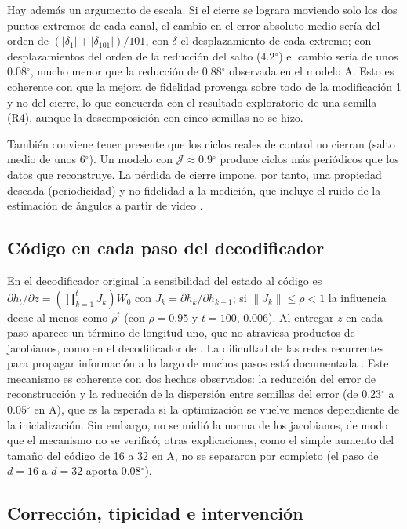 \documentclass[11pt,a4paper]{article}
\newcommand{\gr}{$^{\circ}$}
\begin{document}
Hay además un argumento de escala. Si el cierre se lograra moviendo solo los dos puntos extremos de cada canal, el cambio en el error absoluto medio sería del orden de $(|\delta_1|+|\delta_{101}|)/101$, con $\delta$ el desplazamiento de cada extremo; con desplazamientos del orden de la reducción del salto ($4.2$\gr) el cambio sería de unos $0.08$\gr{}, mucho menor que la reducción de $0.88$\gr{} observada en el modelo A. Esto es coherente con que la mejora de fidelidad provenga sobre todo de la modificación 1 y no del cierre, lo que concuerda con el resultado exploratorio de una semilla (R4), aunque la descomposición con cinco semillas no se hizo.

También conviene tener presente que los ciclos reales de control no cierran (salto medio de unos $6$\gr). Un modelo con $\mathcal J\approx0.9$\gr{} produce ciclos más periódicos que los datos que reconstruye. La pérdida de cierre impone, por tanto, una propiedad deseada (periodicidad) y no fidelidad a la medición, que incluye el ruido de la estimación de ángulos a partir de video \cite{kidzinski2020}.

\subsection{Código en cada paso del decodificador}

En el decodificador original la sensibilidad del estado al código es $\partial h_t/\partial z=(\prod_{k=1}^{t}J_k)W_0$ con $J_k=\partial h_k/\partial h_{k-1}$; si $\|J_k\|\le\rho<1$ la influencia decae al menos como $\rho^t$ (con $\rho=0.95$ y $t=100$, $0.006$). Al entregar $z$ en cada paso aparece un término de longitud uno, que no atraviesa productos de jacobianos, como en el decodificador de \cite{cho2014}. La dificultad de las redes recurrentes para propagar información a lo largo de muchos pasos está documentada \cite{pascanu2013}. Este mecanismo es coherente con dos hechos observados: la reducción del error de reconstrucción y la reducción de la dispersión entre semillas del error (de $0.23$\gr{} a $0.05$\gr{} en A), que es la esperada si la optimización se vuelve menos dependiente de la inicialización. Sin embargo, no se midió la norma de los jacobianos, de modo que el mecanismo no se verificó; otras explicaciones, como el simple aumento del tamaño del código de 16 a 32 en A, no se separaron por completo (el paso de $d=16$ a $d=32$ aporta $0.08$\gr).

\subsection{Corrección, tipicidad e intervención}
\end{document}
